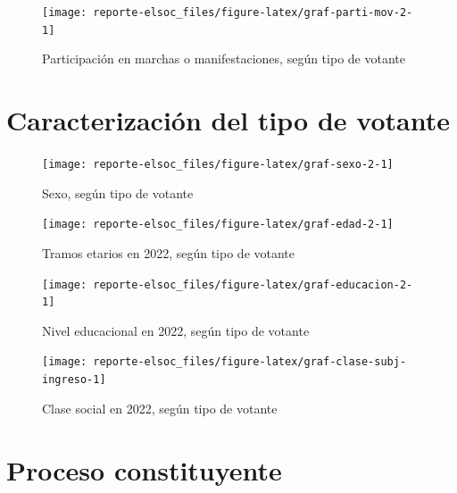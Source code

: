 \documentclass[
  12pt,
]{book}
\begin{document}
\begin{figure}

{\centering \texttt{[image: reporte-elsoc\_files/figure-latex/graf-parti-mov-2-1]} 

}

\caption{Participación en marchas o manifestaciones, según tipo de votante}\label{fig:graf-parti-mov-2}
\end{figure}

\hypertarget{caracterizaciuxf3n-del-tipo-de-votante}{%
\section{Caracterización del tipo de votante}\label{caracterizaciuxf3n-del-tipo-de-votante}}

\begin{figure}

{\centering \texttt{[image: reporte-elsoc\_files/figure-latex/graf-sexo-2-1]} 

}

\caption{Sexo, según tipo de votante}\label{fig:graf-sexo-2}
\end{figure}

\begin{figure}

{\centering \texttt{[image: reporte-elsoc\_files/figure-latex/graf-edad-2-1]} 

}

\caption{Tramos etarios en 2022, según tipo de votante}\label{fig:graf-edad-2}
\end{figure}

\begin{figure}

{\centering \texttt{[image: reporte-elsoc\_files/figure-latex/graf-educacion-2-1]} 

}

\caption{Nivel educacional en 2022, según tipo de votante}\label{fig:graf-educacion-2}
\end{figure}

\begin{figure}

{\centering \texttt{[image: reporte-elsoc\_files/figure-latex/graf-clase-subj-ingreso-1]} 

}

\caption{Clase social en 2022, según tipo de votante}\label{fig:graf-clase-subj-ingreso}
\end{figure}

\hypertarget{proceso-constituyente}{%
\section{Proceso constituyente}\label{proceso-constituyente}}
\end{document}
